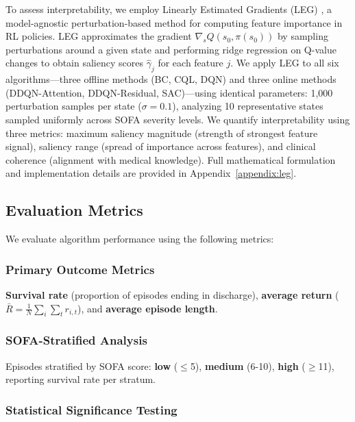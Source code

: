 To assess interpretability, we employ Linearly Estimated Gradients (LEG) \citep{greydanus2018leg}, a model-agnostic perturbation-based method for computing feature importance in RL policies. LEG approximates the gradient $\nabla_s Q(s_0, \pi(s_0))$ by sampling perturbations around a given state and performing ridge regression on Q-value changes to obtain saliency scores $\hat{\gamma}_j$ for each feature $j$. We apply LEG to all six algorithms---three offline methods (BC, CQL, DQN) and three online methods (DDQN-Attention, DDQN-Residual, SAC)---using identical parameters: 1,000 perturbation samples per state ($\sigma = 0.1$), analyzing 10 representative states sampled uniformly across SOFA severity levels. We quantify interpretability using three metrics: maximum saliency magnitude (strength of strongest feature signal), saliency range (spread of importance across features), and clinical coherence (alignment with medical knowledge). Full mathematical formulation and implementation details are provided in Appendix~\ref{appendix:leg}.

\subsection{Evaluation Metrics}\label{sec:methods:eval}

We evaluate algorithm performance using the following metrics:

\subsubsection{Primary Outcome Metrics}

\textbf{Survival rate} (proportion of episodes ending in discharge), \textbf{average return} ($\bar{R} = \frac{1}{N} \sum_i \sum_t r_{i,t}$), and \textbf{average episode length}.

\subsubsection{SOFA-Stratified Analysis}

Episodes stratified by SOFA score: \textbf{low} ($\leq$5), \textbf{medium} (6-10), \textbf{high} ($\geq$11), reporting survival rate per stratum.

\subsubsection{Statistical Significance Testing}

